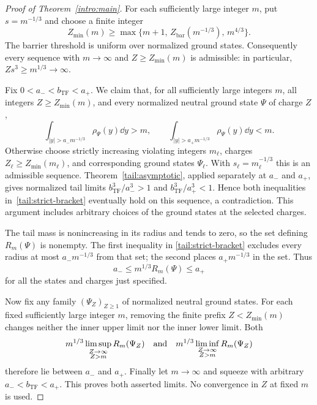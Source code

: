 \begin{proof}[Proof of Theorem~\ref{intro:main}]
For each sufficiently large integer $m$, put $s=m^{-1/3}$ and choose
a finite integer
\[
 Z_{\min}(m)\ge
 \max\{m+1,\,Z_{\mathrm{bar}}(m^{-1/3}),\,m^{4/3}\}.
\]
The barrier threshold is uniform over normalized ground states.
Consequently every sequence with $m\to\infty$ and
$Z\ge Z_{\min}(m)$ is admissible: in particular,
$Zs^3\ge m^{1/3}\to\infty$.

Fix $0<a_-<b_{\mathrm{TF}}<a_+$. We claim that, for all sufficiently large
integers $m$, all integers $Z\ge Z_{\min}(m)$, and every normalized
neutral ground state $\Psi$ of charge $Z$,
\begin{equation}\label{tail:strict-bracket}
 \int_{|y|>a_-m^{-1/3}}\rho_\Psi(y)\dd y>m,
 \qquad
 \int_{|y|>a_+m^{-1/3}}\rho_\Psi(y)\dd y<m.
\end{equation}
Otherwise choose strictly increasing violating integers $m_\ell$,
charges $Z_\ell\ge Z_{\min}(m_\ell)$, and corresponding ground states
$\Psi_\ell$. With $s_\ell=m_\ell^{-1/3}$ this is an admissible
sequence. Theorem~\ref{tail:asymptotic}, applied separately at $a_-$
and $a_+$, gives normalized tail limits
$b_{\mathrm{TF}}^3/a_-^3>1$ and $b_{\mathrm{TF}}^3/a_+^3<1$. Hence both
inequalities in~\eqref{tail:strict-bracket} eventually hold on this
sequence, a contradiction. This argument includes arbitrary choices
of the ground states at the selected charges.

The tail mass is nonincreasing in its radius and tends to zero, so
the set defining $R_m(\Psi)$ is nonempty. The first inequality in
\eqref{tail:strict-bracket} excludes every radius at most
$a_-m^{-1/3}$ from that set; the second places $a_+m^{-1/3}$ in the
set. Thus
\begin{equation}\label{tail:radius-bracket}
 a_-\le m^{1/3}R_m(\Psi)\le a_+
\end{equation}
for all the states and charges just specified.

Now fix any family $(\Psi_Z)_{Z\ge1}$ of normalized neutral ground
states. For each fixed sufficiently large integer $m$, removing the
finite prefix $Z<Z_{\min}(m)$ changes neither the inner upper limit
nor the inner lower limit. Both
\[
 m^{1/3}\limsup_{\substack{Z\to\infty\\Z>m}}R_m(\Psi_Z)
 \quad\hbox{and}\quad
 m^{1/3}\liminf_{\substack{Z\to\infty\\Z>m}}R_m(\Psi_Z)
\]
therefore lie between $a_-$ and $a_+$. Finally let $m\to\infty$ and
squeeze with arbitrary $a_-<b_{\mathrm{TF}}<a_+$. This proves both asserted
limits. No convergence in $Z$ at fixed $m$ is used.
\end{proof}
